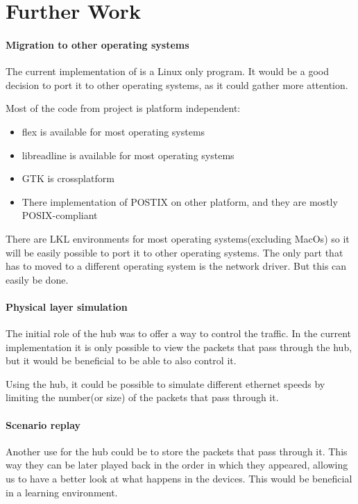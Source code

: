 \chapter{Further Work}
\label{chapter:further}

\subsubsection{Migration to other operating systems}

The current implementation of \textbf{\project} is a Linux only program. It would be a good
decision to port it to other operating systems, as it could gather more attention. 

Most of the code from project is platform independent:
\begin{itemize}
  \item flex is available for most operating systems
  \item libreadline is available for most operating systems
  \item GTK is crossplatform
  \item There implementation of POSTIX on other platform, and they are mostly POSIX-compliant
\end{itemize}

There are LKL environments for most operating systems(excluding MacOs) so it will be easily possible to port it
to other operating systems. The only part that has to moved to a different operating system is the network driver.
But this can easily be done.

\subsubsection{Physical layer simulation}

The initial role of the hub was to offer a way to control the traffic. In the current implementation it is
only possible to view the packets that pass through the hub, but it would be beneficial to be able to also control
it.

Using the hub, it could be possible to simulate different ethernet speeds by limiting the number(or size) of the packets
that pass through it.

\subsubsection{Scenario replay}

Another use for the hub could be to store the packets that pass through it. This way they can be later played back in the
order in which they appeared, allowing us to have a better look at what happens in the devices. This would be beneficial
in a learning environment.

